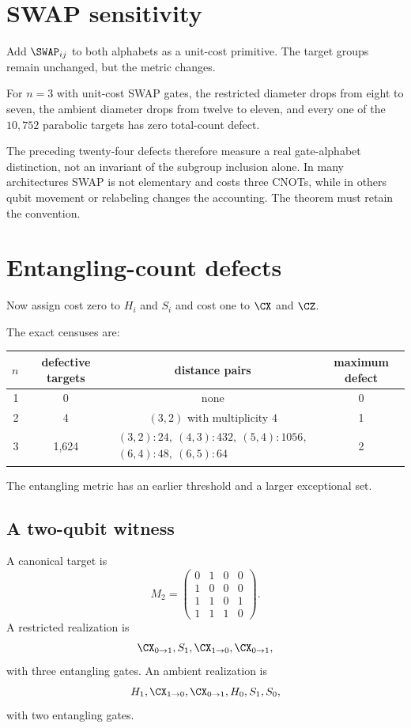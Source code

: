 \section{SWAP sensitivity}
Add $\SWAP_{ij}$ to both alphabets as a unit-cost primitive.  The target groups remain unchanged, but the metric changes.

\begin{computedbox}
For $n=3$ with unit-cost SWAP gates, the restricted diameter drops from eight to seven, the ambient diameter drops from twelve to eleven, and every one of the $10,752$ parabolic targets has zero total-count defect.
\end{computedbox}

The preceding twenty-four defects therefore measure a real gate-alphabet distinction, not an invariant of the subgroup inclusion alone.  In many architectures SWAP is not elementary and costs three CNOTs, while in others qubit movement or relabeling changes the accounting.  The theorem must retain the convention.

\section{Entangling-count defects}
Now assign cost zero to $H_i$ and $S_i$ and cost one to $\CX$ and $\CZ$.

\begin{computedbox}
The exact censuses are:
\begin{center}
\begin{tabular}{@{}rccc@{}}
\toprule
$n$&defective targets&distance pairs&maximum defect\\
\midrule
1&0&none&0\\
2&4&$(3,2)$ with multiplicity $4$&1\\
3&1,624&
$\begin{array}{c}
(3,2):24,\ (4,3):432,\ (5,4):1056,\\
(6,4):48,\ (6,5):64
\end{array}$
&2\\
\bottomrule
\end{tabular}
\end{center}
\end{computedbox}
The entangling metric has an earlier threshold and a larger exceptional set.

\subsection{A two-qubit witness}
A canonical target is
\[
M_2=
\begin{pmatrix}
0&1&0&0\\
1&0&0&0\\
1&1&0&1\\
1&1&1&0
\end{pmatrix}.
\]
A restricted realization is
\[
\CX_{0\to1},
S_1,
\CX_{1\to0},
\CX_{0\to1},
\]
with three entangling gates.  An ambient realization is
\[
H_1,
\CX_{1\to0},
\CX_{0\to1},
H_0,
S_1,
S_0,
\]
with two entangling gates.


